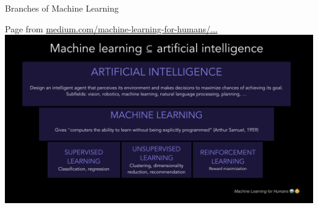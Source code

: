 \documentclass[10pt,serif,mathserif,compress,hyperref={colorlinks}]{beamer}
\begin{document}
\begin{frame}{Branches of Machine Learning}

  {\small Page from \href{https://medium.com/machine-learning-for-humans/why-machine-learning-matters-6164faf1df12}
  {medium.com/machine-learning-for-humans/...}}\\[2mm]
  
  \hspace*{-10mm}\includegraphics[width=1.2\textwidth]{images/AI-from_MachineLearningForHumans.png}
  \vspace*{-8mm}
  
\end{frame}
\end{document}
